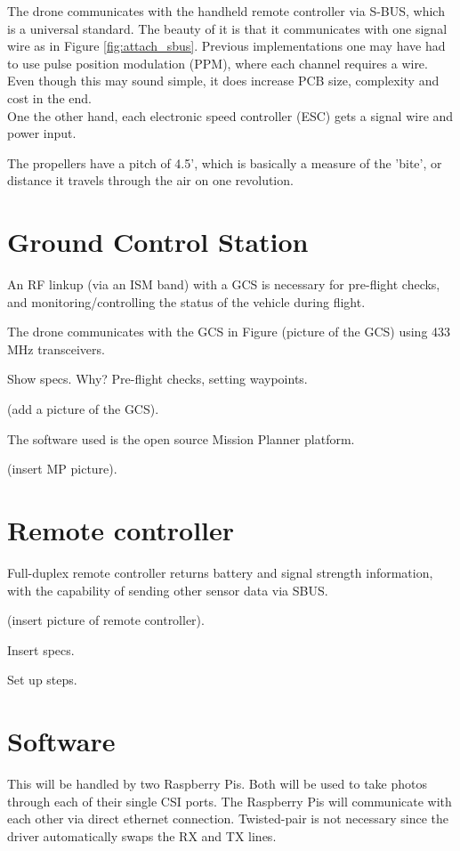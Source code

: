 The drone communicates with the handheld remote controller via S-BUS, which is a universal standard. The beauty of it is that it communicates with one signal wire as in Figure \ref{fig:attach_sbus}. Previous implementations one may have had to use pulse position modulation (PPM), where each channel requires a wire. Even though this may sound simple, it does increase PCB size, complexity and cost in the end.\\

One the other hand, each electronic speed controller (ESC) gets a signal wire and power input.

The propellers have a pitch of 4.5', which is basically a measure of the 'bite', or distance it travels through the air on one revolution.

\section{Ground Control Station}

An RF linkup (via an ISM band) with a GCS is necessary for pre-flight checks, and monitoring/controlling the status of the vehicle during flight.

The drone communicates with the GCS in Figure (picture of the GCS) using 433 MHz transceivers.

Show specs. Why? Pre-flight checks, setting waypoints.

(add a picture of the GCS).

The software used is the open source Mission Planner platform.

(insert MP picture).

\section{Remote controller}

Full-duplex remote controller returns battery and signal strength information, with the capability of sending other sensor data via SBUS.

(insert picture of remote controller).

Insert specs.

Set up steps.

\section{Software}

This will be handled by two Raspberry Pis. Both will be used to take photos through each of their single CSI ports. The Raspberry Pis will communicate with each other via direct ethernet connection. Twisted-pair is not necessary since the driver automatically swaps the RX and TX lines.


